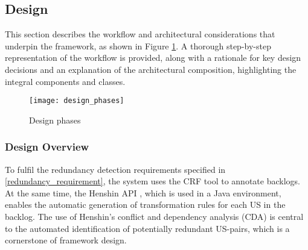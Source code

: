 \subsection{Design}\label{desing}

This section describes the workflow and architectural considerations that underpin the framework, as shown in Figure \ref{fig:design_phases}. A thorough step-by-step representation of the workflow is provided, along with a rationale for key design decisions and an explanation of the architectural composition, highlighting the integral components and classes.
\begin{figure}[h]
	\centering 
	\texttt{[image: design\_phases]}
	\caption{Design phases}\label{fig:design_phases}
\end{figure} 
\subsubsection*{Design Overview}

To fulfil the redundancy detection requirements specified in \ref{redundancy_requirement}, the system uses the CRF tool \cite{mosser2022modelling} to annotate backlogs. At the same time, the Henshin API \cite{arendt2010henshin}, which is used in a Java environment, enables the automatic generation of transformation rules for each US in the backlog. The use of Henshin's conflict and dependency analysis (CDA) \cite{mens2007analysing} is central to the automated identification of potentially redundant US-pairs, which is a cornerstone of framework design.

